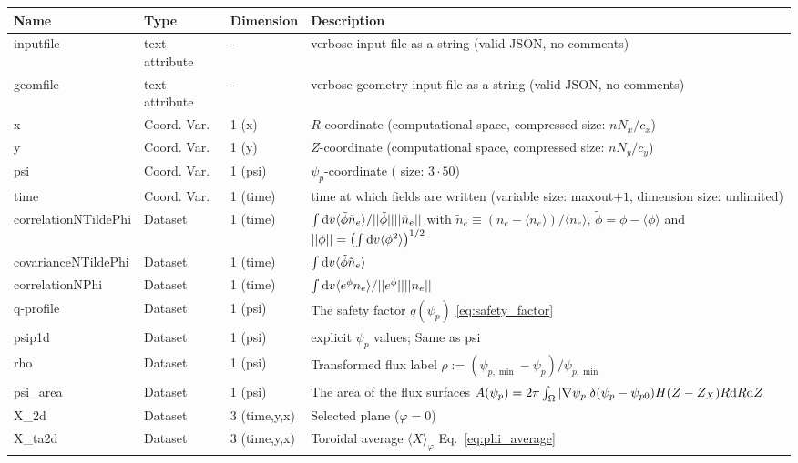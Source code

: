 \begin{longtable}{lll>{\RaggedRight}p{7cm}}
\toprule
\rowcolor{gray!50}\textbf{Name} &  \textbf{Type} & \textbf{Dimension} & \textbf{Description}  \\ \midrule
inputfile  &     text attribute & - & verbose input file as a string (valid JSON, no comments) \\
geomfile   &     text attribute & - & verbose geometry input file as a string (valid JSON, no comments) \\
x                & Coord. Var. & 1 (x) & $R$-coordinate (computational space, compressed size: $nN_x/c_x$)\\
y                & Coord. Var. & 1 (y) & $Z$-coordinate (computational space, compressed size: $nN_y/c_y$)\\
psi              & Coord. Var. & 1 (psi) & $\psi_p$-coordinate ( size: $3\cdot 50$) \\
time             & Coord. Var. & 1 (time)& time at which fields are written (variable size: maxout$+1$, dimension size: unlimited) \\
correlationNTildePhi  & Dataset & 1 (time) & $ \int\mathrm{d} v \langle \tilde \phi \tilde n_e\rangle / ||\tilde \phi||||\tilde n_e||$
with $\tilde n_e \equiv (n_e - \langle n_e \rangle)/\langle n_e\rangle$, 
$\tilde\phi = \phi - \langle\phi\rangle$
and $||\phi|| = \left( \int \mathrm{d} v \langle \phi^2 \rangle\right)^{1/2}$
\\
covarianceNTildePhi  & Dataset & 1 (time) & $ \int\mathrm{d} v \langle \tilde \phi \tilde n_e\rangle $
\\
correlationNPhi  & Dataset & 1 (time) & $\int\mathrm{d} v \langle e^\phi n_e\rangle/ ||e^\phi||||n_e||$\\
q-profile        & Dataset & 1 (psi) & The safety factor $q(\psi_p)$ \eqref{eq:safety_factor} \\
psip1d           & Dataset & 1 (psi) & explicit $\psi_p$ values; Same as psi \\
rho              & Dataset & 1 (psi) & Transformed flux label $\rho:= (\psi_{p,\min} - \psi_p)/\psi_{p,\min}$ \\
psi\_area        & Dataset & 1 (psi) & The area of the flux surfaces $A(\psi_p) = 2\pi \int_\Omega |\nabla\psi_p| \delta(\psi_p - \psi_{p0}) H(Z-Z_X) R\mathrm{d} R\mathrm{d} Z$ \\
X\_2d            & Dataset & 3 (time,y,x) & Selected plane ($\varphi=0$) \\
X\_ta2d          & Dataset & 3 (time,y,x) & Toroidal average $\langle X
    \rangle_\varphi$ Eq.~\eqref{eq:phi_average} \\

\end{longtable}
